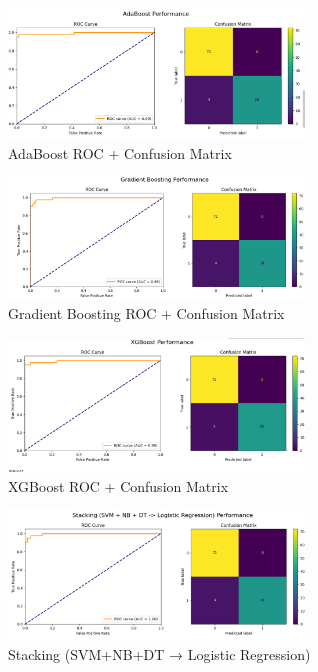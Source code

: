 \documentclass[12pt,a4paper]{article}
\begin{document}
\clearpage


\begin{figure}[h!]
    \centering
    \includegraphics[width=0.7\textwidth]{4.png}
    \caption{AdaBoost ROC + Confusion Matrix}
\end{figure}

\begin{figure}[h!]
    \centering
    \includegraphics[width=0.7\textwidth]{5.png}
    \caption{Gradient Boosting ROC + Confusion Matrix}
\end{figure}

\begin{figure}[h!]
    \centering
    \includegraphics[width=0.7\textwidth]{6.png}
    \caption{XGBoost ROC + Confusion Matrix}
\end{figure}

\clearpage


\begin{figure}[h!]
    \centering
    \includegraphics[width=0.7\textwidth]{7.png}
    \caption{Stacking (SVM+NB+DT → Logistic Regression)}
\end{figure}
\end{document}
